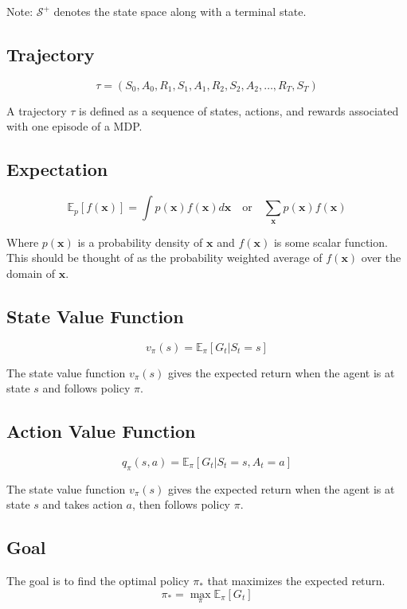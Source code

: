 \documentclass{article}
\begin{document}
Note: $\mathcal{S}^+$ denotes the state space along with a terminal state.

\subsection{Trajectory}
\begin{equation}
  \tau = (S_0, A_0, R_1, S_1, A_1, R_2, S_2, A_2, \dots, R_T, S_T)
\end{equation}

A trajectory $\tau$ is defined as a sequence of states, actions, and rewards associated with one episode of a MDP.

\subsection{Expectation}
\begin{equation}
  \mathbb{E}_p[f(\bm{x})] = \int p(\bm{x}) f(\bm{x}) d\bm{x} \quad \mbox{or} \quad \sum_{\bm{x}} p(\bm{x}) f(\bm{x})
\end{equation}

Where $p(\bm{x})$ is a probability density of $\bm{x}$ and $f(\bm{x})$ is some scalar function. This should be thought of 
as the probability weighted average of $f(\bm{x})$ over the domain of $\bm{x}$.

\subsection{State Value Function}
\begin{equation}
  v_\pi(s) = \mathbb{E}_\pi[G_t|S_t = s]
\end{equation}

The state value function $v_\pi(s)$ gives the expected return when the agent is at state $s$ and follows policy $\pi$.

\subsection{Action Value Function}
\begin{equation}
  q_\pi(s, a) = \mathbb{E}_\pi[G_t|S_t = s, A_t = a]
\end{equation}

The state value function $v_\pi(s)$ gives the expected return when the agent is at state $s$ and takes action $a$, then follows policy $\pi$.

\subsection{Goal}
The goal is to find the optimal policy $\pi_*$ that maximizes the expected return.
\begin{equation}
  \pi_* = \max_{\pi}\mathbb{E}_\pi[G_t]
\end{equation}
\end{document}

